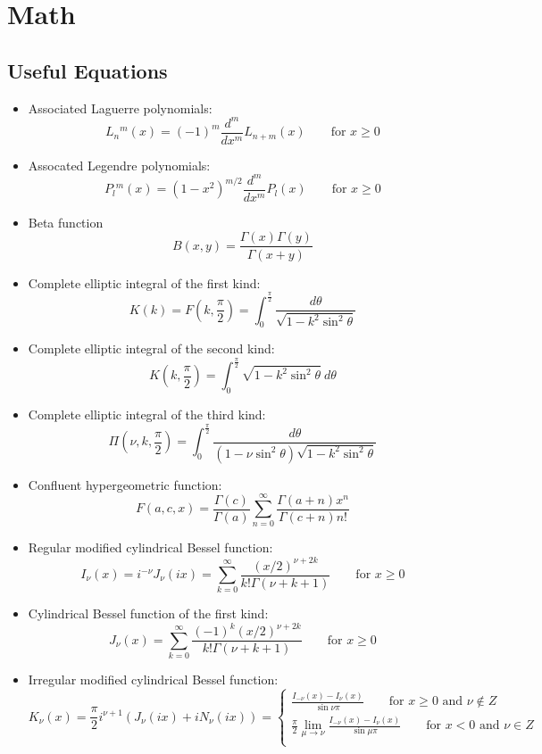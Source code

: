 \chapter{Math}

\section{Useful Equations}
\begin{itemize}
    \item Associated Laguerre polynomials:
	$$ L_n{}^m(x) = (-1)^m\frac{d^m}{dx^m}L_{n+m}(x) \qquad \text{for } x \ge 0$$
    \item Assocated Legendre polynomials:
	$$ P_l{}^m(x) = (1-x^2)^{m/2}\frac{d^m}{dx^m}P_{l}(x) \qquad \text{for } x \ge 0$$
    \item Beta function
	$$ B(x,y) = \frac{\Gamma(x)\Gamma(y)}{\Gamma(x+y)} $$
    \item Complete elliptic integral of the first kind:
	$$ K(k) = F(k,\frac{\pi}{2}) = \int_0^{\frac{\pi}{2}}\frac{d\theta}{\sqrt{1-k^2\sin^2\theta}}$$
    \item Complete elliptic integral of the second kind:
	$$ K(k,\frac{\pi}{2}) = \int_0^{\frac{\pi}{2}}\sqrt{1-k^2\sin^2\theta}\ d\theta$$
    \item Complete elliptic integral of the third kind:
	$$ \Pi(\nu,k,\frac{\pi}{2}) = \int_0^{\frac{\pi}{2}}\frac{d\theta}{(1-\nu\sin^2\theta)\sqrt{1-k^2\sin^2\theta}}$$
    \item Confluent hypergeometric function:
	$$ F(a,c,x)= \frac{\Gamma(c)}{\Gamma(a)}\sum_{n=0}^\infty\frac{\Gamma(a+n)x^n}{\Gamma(c+n)n!}$$
    \item Regular modified cylindrical Bessel function:
	$$ I_\nu(x) = i^{-\nu} J_\nu(ix) = \sum_{k=0}^{\infty}\frac{(x/2)^{\nu+2k}}{k!\Gamma(\nu+k+1)} \qquad \text{for } x \ge 0$$
    \item Cylindrical Bessel function of the first kind:
	$$ J_\nu(x) = \sum_{k=0}^{\infty}\frac{(-1)^k(x/2)^{\nu+2k}}{k!\Gamma(\nu+k+1)} \qquad \text{for } x \ge 0$$
    \item Irregular modified cylindrical Bessel function: 
	$$ K_\nu(x) = \frac{\pi}{2}i^{\nu+1}(J_\nu(ix) + iN_\nu(ix)) = 
	    \begin{cases}
		\frac{I_{-\nu}(x) - I_\nu(x)}{\sin\nu\pi}   \qquad \text{for } x\ge0 \text{ and } \nu \notin Z \\
		\displaystyle \frac{\pi}{2}\lim_{\mu\rightarrow\nu}\frac{I_{-\nu}(x) - I_\nu(x)}{\sin\mu\pi}	\qquad \text{for } x<0 \text{ and } \nu \in Z \\

\end{cases}$$
\end{itemize}
